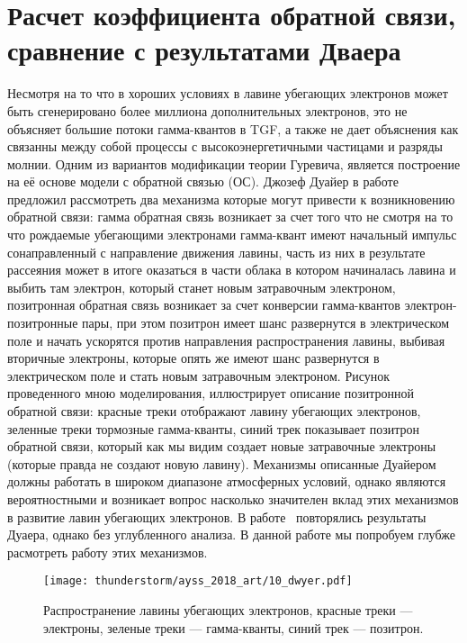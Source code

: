 \section{Расчет коэффициента обратной связи, сравнение с результатами Дваера}\label{sec:thunderstorm/rdfm}

Несмотря на то что в хороших условиях в лавине убегающих электронов может быть сгенерировано более миллиона дополнительных электронов, это не объясняет большие потоки гамма-квантов в TGF, а также не дает объяснения как связанны между собой процессы с высокоэнергетичными частицами и разряды молнии. Одним из вариантов модификации теории Гуревича, является построение на её основе модели с обратной связью (ОС). Джозеф Дуайер в работе~\cite{dwyer2003fundamental} предложил рассмотреть два механизма которые могут привести к возникновению обратной связи: гамма обратная связь возникает за счет того что не смотря на то что рождаемые убегающими электронами гамма-квант имеют начальный импульс сонаправленный с направление движения лавины, часть из них в результате рассеяния может в итоге оказаться в части облака в котором начиналась лавина и выбить там электрон, который станет новым затравочным электроном, позитронная обратная связь возникает за счет конверсии гамма-квантов электрон-позитронные пары, при этом позитрон имеет шанс развернутся в электрическом поле и начать ускорятся против направления распространения лавины, выбивая вторичные электроны, которые опять же имеют шанс развернутся в электрическом поле и стать новым затравочным электроном. Рисунок проведенного мною моделирования, иллюстрирует описание позитронной обратной связи: красные треки отображают лавину убегающих электронов, зеленные треки тормозные гамма-кванты, синий трек показывает позитрон обратной связи, который как мы видим создает новые затравочные электроны (которые правда не создают новую лавину). Механизмы описанные Дуайером должны работать в широком диапазоне атмосферных условий, однако являются вероятностными и возникает вопрос насколько значителен вклад этих механизмов в развитие лавин убегающих электронов. В работе~\cite{skeltved2014} повторялись результаты Дуаера, однако без углубленного анализа. В данной работе мы попробуем глубже расмотреть работу этих механизмов.

\begin{figure}[ph!]
    \begin{center}
        \texttt{[image: thunderstorm/ayss\_2018\_art/10\_dwyer.pdf]}
        \caption{Распространение лавины убегающих электронов, красные треки --- электроны, зеленые треки --- гамма-кванты, синий трек --- позитрон.}
    \end{center}
    \label{fig:storm:dwyer}
\end{figure}

